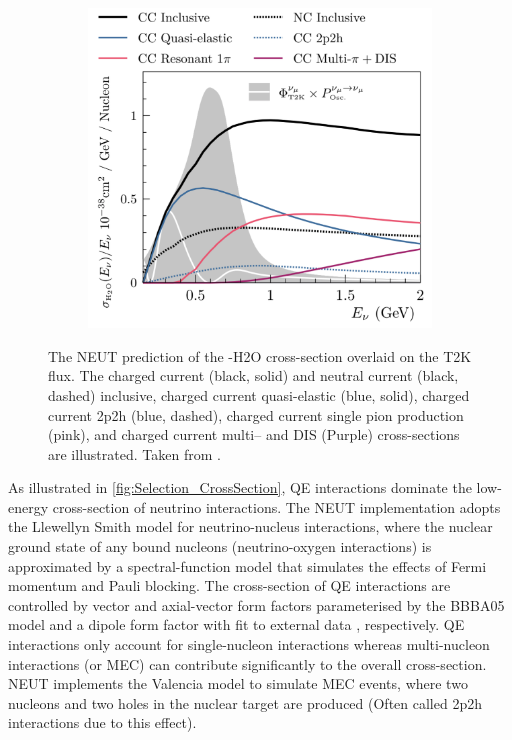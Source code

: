 \begin{figure}[h]
  \begin{subfigure}[t]{0.8\textwidth}
    \includegraphics[width=\textwidth, trim={0mm 0mm 0mm 0mm}, clip,page=1]{Figures/Selections/NEUTCrossSection.pdf}
  \end{subfigure}
  \caption{The NEUT prediction of the \quickmath{\nu_{\mu}}-H2O cross-section overlaid on the T2K \quickmath{\nu_{\mu}} flux. The charged current (black, solid) and neutral current (black, dashed) inclusive, charged current quasi-elastic (blue, solid), charged current 2p2h (blue, dashed), charged current single pion production (pink), and charged current multi--\quickmath{\pi} and DIS (Purple) cross-sections are illustrated. Taken from \cite{Hayato2021}.}
  \label{fig:Selection_CrossSection}
\end{figure}

As illustrated in \autoref{fig:Selection_CrossSection}, QE interactions dominate the low-energy cross-section of neutrino interactions. The NEUT implementation adopts the Llewellyn Smith \cite{llewelyn-smith} model for neutrino-nucleus interactions, where the nuclear ground state of any bound nucleons (neutrino-oxygen interactions) is approximated by a spectral-function \cite{Benhar1989} model that simulates the effects of Fermi momentum and Pauli blocking. The cross-section of QE interactions are controlled by vector and axial-vector form factors parameterised by the BBBA05 \cite{bbba05} model and a dipole form factor with  fit to external data \cite{Aguilar_Arevalo_2010}, respectively. QE interactions only account for single-nucleon interactions whereas multi-nucleon interactions (or MEC) can contribute significantly to the overall cross-section. NEUT implements the Valencia \cite{nieves2} model to simulate MEC events, where two nucleons and two holes in the nuclear target are produced (Often called 2p2h interactions due to this effect).

